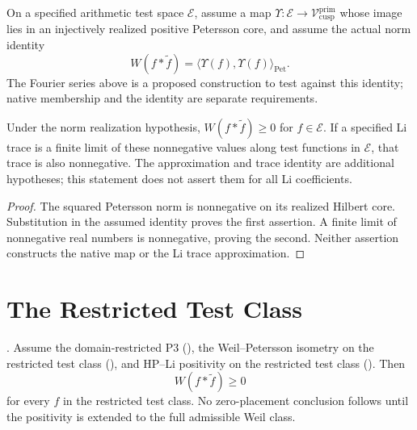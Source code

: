 \begin{hypothesis}
\label{v4-arith:w5-direct:thm:WP-isometry}
On a specified arithmetic test space \(\mathcal E\), assume a map
\(\Upsilon:\mathcal E\to\mathcal V^{\mathrm{prim}}_{\mathrm{cusp}}\)
whose image lies in an injectively realized positive Petersson core,
and assume the actual norm identity
\begin{equation}
 W(f*\widetilde f)=\langle\Upsilon(f),\Upsilon(f)\rangle_{\mathrm{Pet}}.
 \label{v4-arith:w5-direct:eq:WP-isometry}
\end{equation}
The Fourier series above is a proposed construction to test against this
identity; native membership and the identity are separate requirements.
\end{hypothesis}

\begin{theorem}
\label{v4-arith:w5-direct:thm:HPLi-elementary}
Under the norm realization hypothesis, \(W(f*\widetilde f)\ge0\) for
\(f\in\mathcal E\). If a specified Li trace is a finite limit of these
nonnegative values along test functions in \(\mathcal E\), that trace
is also nonnegative. The approximation and trace identity are additional
hypotheses; this statement does not assert them for all Li coefficients.
\end{theorem}
\begin{proof}
The squared Petersson norm is nonnegative on its realized Hilbert core.
Substitution in the assumed identity proves the first assertion. A
finite limit of nonnegative real numbers is nonnegative, proving the
second. Neither assertion constructs the native map or the Li trace
approximation.
\end{proof}

\section{The Restricted Test Class}
\label{v4-arith:w5-direct:closing-restricted}

\begin{theorem}
\label{v4-arith:w5-direct:thm:restricted-RH}
\ClaimStatusProvedHere. Assume the domain-restricted P3
(), the Weil--Petersson
isometry on the restricted test class
(), and HP--Li positivity on
the restricted test class
(). Then
\[
W(f\ast\widetilde f)\geq0
\]
for every \(f\) in the restricted test class.  No zero-placement
conclusion follows until the positivity is extended to the full
admissible Weil class.
\end{theorem}

